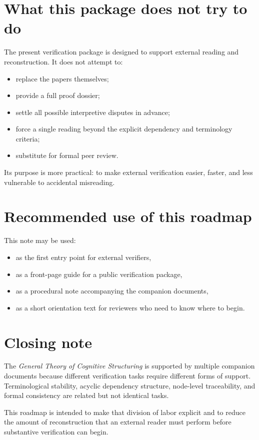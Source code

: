\documentclass[11pt,a4paper]{article}
\begin{document}
\section{What this package does not try to do}

The present verification package is designed to support external reading and reconstruction.
It does not attempt to:
\begin{itemize}[leftmargin=2em]
	\item replace the papers themselves;
	\item provide a full proof dossier;
	\item settle all possible interpretive disputes in advance;
	\item force a single reading beyond the explicit dependency and terminology criteria;
	\item substitute for formal peer review.
\end{itemize}

Its purpose is more practical: to make external verification easier, faster, and less vulnerable
to accidental misreading.

\section{Recommended use of this roadmap}

This note may be used:
\begin{itemize}[leftmargin=2em]
	\item as the first entry point for external verifiers,
	\item as a front-page guide for a public verification package,
	\item as a procedural note accompanying the companion documents,
	\item as a short orientation text for reviewers who need to know where to begin.
\end{itemize}

\section{Closing note}

The \emph{General Theory of Cognitive Structuring} is supported by multiple companion documents because different verification tasks require different forms of support. Terminological stability, acyclic dependency structure, node-level traceability, and formal consistency are related but not identical tasks.

This roadmap is intended to make that division of labor explicit and to reduce the amount of
reconstruction that an external reader must perform before substantive verification can begin.
\end{document}
